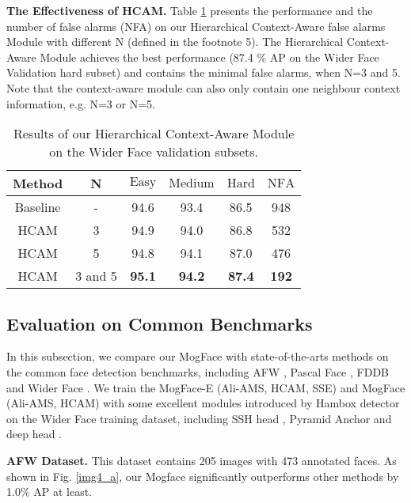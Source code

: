 \documentclass[10pt,twocolumn,letterpaper]{article}
\begin{document}
\noindent\textbf{The Effectiveness of HCAM.} Table \ref{table_8} presents the performance and the number of false alarms (NFA) on our Hierarchical Context-Aware false alarms  Module with different N (defined in the footnote 5). The Hierarchical Context-Aware Module achieves the best performance (87.4 \% AP on the Wider Face Validation hard subset) and contains the minimal false alarms, when N=3 and 5. Note that the  context-aware module can also only contain one neighbour context information, e.g. N=3 or N=5.


\begin{table}[h]
\small
\renewcommand\arraystretch{1.1}
	\begin{center}
	\setlength{\tabcolsep}{6pt}
	\begin{tabular}{c|ccccc}
		\hline
		Method   & N  &$\text{Easy}$  & $\text{Medium}$ & $\text{Hard}$ &$\text{NFA}$ \\
		\hline
		Baseline  & - &94.6  &93.4 &86.5 & 948 \\
		HCAM    &3  & 94.9 &94.0 & 86.8 & 532\\
		HCAM    &5  & 94.8 &94.1 & 87.0 & 476\\
		HCAM    &3 and 5 &\textbf{95.1}	& \textbf{94.2}	& \textbf{87.4}  &\textbf{192}\\
		\hline				
	\end{tabular}
	\end{center}
\vspace{-10pt}
\caption{Results of our Hierarchical Context-Aware Module on the Wider Face validation subsets.
}
\label{table_8}
\end{table}

\subsection{Evaluation on Common Benchmarks}

In this subsection, we  compare our MogFace with state-of-the-arts methods on the common face detection benchmarks, including AFW \cite{zhu2012face}, Pascal Face \cite{yan2014face}, FDDB \cite{jain2010fddb} and Wider Face \cite{yang2016wider}. We train the MogFace-E (Ali-AMS, HCAM, SSE) and MogFace (Ali-AMS, HCAM) with some excellent modules introduced by Hambox \cite{liu2019hambox} detector on the  Wider Face training dataset, including SSH head \cite{najibi2017ssh}, Pyramid Anchor \cite{tang2018pyramidbox} and deep head \cite{lin2017focal}. 


\noindent \textbf{AFW Dataset.} This dataset contains 205 images with 473 annotated faces. As shown in Fig. \ref{img4_a},  our Mogface significantly outperforms other methods by 1.0\% AP at least.
\end{document}
